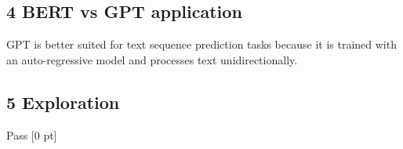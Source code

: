 \documentclass{article}
\begin{document}
\subsection*{4 BERT vs GPT application}

GPT is better suited for text sequence prediction tasks because it is trained with an auto-regressive model and processes text unidirectionally.

\subsection*{5 Exploration}

Pass [0 pt]
\end{document}
